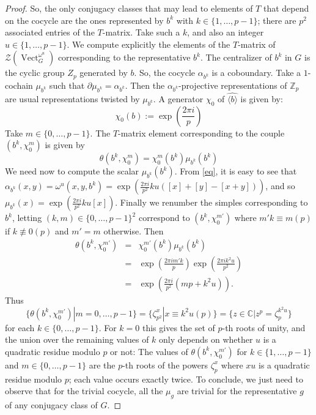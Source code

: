 \documentclass[12pt]{amsart}
\theoremstyle{remark}
\theoremstyle{definition}
\numberwithin{equation}{section}
\newcommand\Vect{\operatorname{Vect}}
\newcommand\CC{\mathbb C}
\newcommand\ZZ{\mathbb Z}
\newcommand\CTR{\mathcal Z}
\begin{document}
\begin{proof}
So, the only conjugacy classes that may lead to elements of $T$ that depend on the cocycle are the ones represented by $b^k$ with $k \in \lbrace 1 ,\dots , p-1 \rbrace$; there are $p^2$ associated entries of the $T$-matrix. Take such a $k$, and also an integer $u \in \lbrace 1 , \dots , p-1 \rbrace$. We compute explicitly the elements of the $T$-matrix of $\CTR(\Vect^{\omega^u}_G)$ corresponding to the representative $b^k$. The centralizer of $b^k$ in $G$ is the cyclic group $Z_p$ generated by $b$. So, the cocycle $\alpha_{b^k}$ is a coboundary. Take a $1$-cochain $\mu_{b^k}$ such that $\partial \mu_{b^k} = \alpha_{b^k}$. Then the $\alpha_{b^k}$-projective representations of $\ZZ_p$ are usual representations twisted by $\mu_{b^k}$. A generator $\chi_0$ of $\widehat{\langle b \rangle}$ is given by: 
$$ \chi_0(b):=\exp\left(\frac{2\pi i}{p}\right)$$
Take $m \in \lbrace 0 , \dots , p-1 \rbrace$. The $T$-matrix element corresponding to the couple $(b^k, \chi_0^m)$ is given by 
$$ \theta(b^k,\chi_0^m)=\chi_0^m(b^k) \mu_{b^k}(b^k)$$
We need now to compute the scalar $\mu_{b^k}(b^k)$. From \ref{eq}, it is easy to see that $\alpha_{b^k}(x,y)=\omega^u(x,y,{b^k})=\exp \left( \frac{2 \pi i}{p^2}ku([x]+[y]-[x+y])\right)$, and so $\mu_ {b^k}(x)=\exp \left( \frac{2 \pi i}{p^2}ku[x]\right)$. Finally we renumber the simples corresponding to $b^k$, letting $(k,m)\in\{0,\dots,p-1\}^2$ correspond to $(b^k,\chi_0^{m'})$ where $m'k\equiv m(p)$ if $k\not\equiv 0(p)$ and $m'=m$ otherwise. Then
\begin{eqnarray*}
\theta(b^k,\chi_0^{m'}) & = & \chi_0^{m'}(b^k) \mu_{b^k}(b^k)\\
 & = & \exp\left(\frac{2\pi i m'k}{p}\right) \exp\left(\frac{2\pi i k^2 u}{p^2}\right)\\
 & = & \exp\left(\frac{2 \pi i}{p^2}(mp+k^2 u) \right).
\end{eqnarray*}
Thus 
\begin{equation*}
  \{\theta(b^k,\chi_0^{m'})|m=0,\dots,p-1\}=\{\zeta_{p^2}^x|x\equiv k^2u(p)\}=\{z\in\CC|z^p=\zeta_p^{k^2u}\}
\end{equation*}
for each $k\in\{0,\dots,p-1\}$. For $k=0$ this gives the set of $p$-th roots of unity, and the union over the remaining values of $k$ only depends on whether $u$ is a quadratic residue modulo $p$ or not: The values of $\theta(b^k,\chi_0^{m'})$ for $k\in\{1,\dots,p-1\}$ and $m\in\{0,\dots,p-1\}$ are the $p$-th roots of the powers $\zeta_p^x$ where $xu$ is a quadratic residue modulo $p$; each value occurs exactly twice.
To conclude, we just need to observe that for the trivial cocycle, all the $\mu_g$ are trivial for the representative $g$ of any conjugacy class of $G$.
\end{proof}
\end{document}
